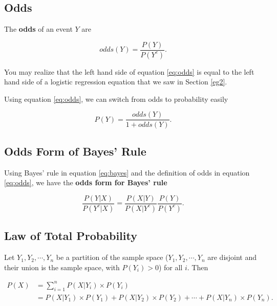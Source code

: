 \documentclass[
]{book}
\begin{document}
\hypertarget{odds}{%
\subsection{Odds}\label{odds}}

The \textbf{odds} of an event \(Y\) are

\begin{equation} 
odds(Y) = \frac{P(Y)}{P(Y^c)}.
\label{eq:odds}
\end{equation}

You may realize that the left hand side of equation \eqref{eq:odds} is equal to the left hand side of a logistic regression equation that we saw in Section \ref{eg2}.

Using equation \eqref{eq:odds}, we can switch from odds to probability easily

\begin{equation} 
P(Y) = \frac{odds(Y)}{1 + odds(Y)}.
\label{eq:odds2}
\end{equation}

\hypertarget{odds-form-of-bayes-rule}{%
\subsection{Odds Form of Bayes' Rule}\label{odds-form-of-bayes-rule}}

Using Bayes' rule in equation \eqref{eq:bayes} and the definition of odds in equation \eqref{eq:odds}, we have the \textbf{odds form for Bayes' rule}

\begin{equation} 
\frac{P(Y|X)}{P(Y^c|X)} = \frac{P(X|Y)}{P(X|Y^c)} \frac{P(Y)}{P(Y^c)}. 
\label{eq:oddsbayes}
\end{equation}

\hypertarget{law-of-total-probability}{%
\subsection{Law of Total Probability}\label{law-of-total-probability}}

Let \(Y_1, Y_2, \cdots, Y_n\) be a partition of the sample space (\(Y_1, Y_2, \cdots, Y_n\) are disjoint and their union is the sample space, with \(P(Y_i) > 0\)) for all \(i\). Then

\begin{equation} 
\begin{split}
P(X) &= \sum_{i=1}^n P(X|Y_i) \times P(Y_i)\\
    &= P(X|Y_1) \times P(Y_1) + P(X|Y_2) \times P(Y_2) + \cdots + P(X|Y_n) \times P(Y_n).
\end{split}
\label{eq:total}
\end{equation}
\end{document}
